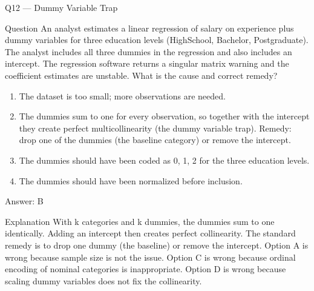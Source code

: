 \documentclass[aspectratio=169,8pt]{beamer}
\begin{document}
	\begin{frame}{Q12 --- Dummy Variable Trap}
		\begin{block}{Question}
			An analyst estimates a linear regression of salary on experience plus dummy variables for three education levels (HighSchool, Bachelor, Postgraduate). The analyst includes all three dummies in the regression and also includes an intercept. The regression software returns a singular matrix warning and the coefficient estimates are unstable. What is the cause and correct remedy?
		\end{block}
		\begin{enumerate}
			\item The dataset is too small; more observations are needed.
			\item The dummies sum to one for every observation, so together with the intercept they create perfect multicollinearity (the dummy variable trap). Remedy: drop one of the dummies (the baseline category) or remove the intercept.
			\item The dummies should have been coded as 0, 1, 2 for the three education levels.
			\item The dummies should have been normalized before inclusion.
		\end{enumerate}
		\begin{exampleblock}{Answer: B}\end{exampleblock}
		\begin{block}{Explanation}
			With k categories and k dummies, the dummies sum to one identically. Adding an intercept then creates perfect collinearity. The standard remedy is to drop one dummy (the baseline) or remove the intercept. Option A is wrong because sample size is not the issue. Option C is wrong because ordinal encoding of nominal categories is inappropriate. Option D is wrong because scaling dummy variables does not fix the collinearity.
		\end{block}
	\end{frame}
	
\end{document}
